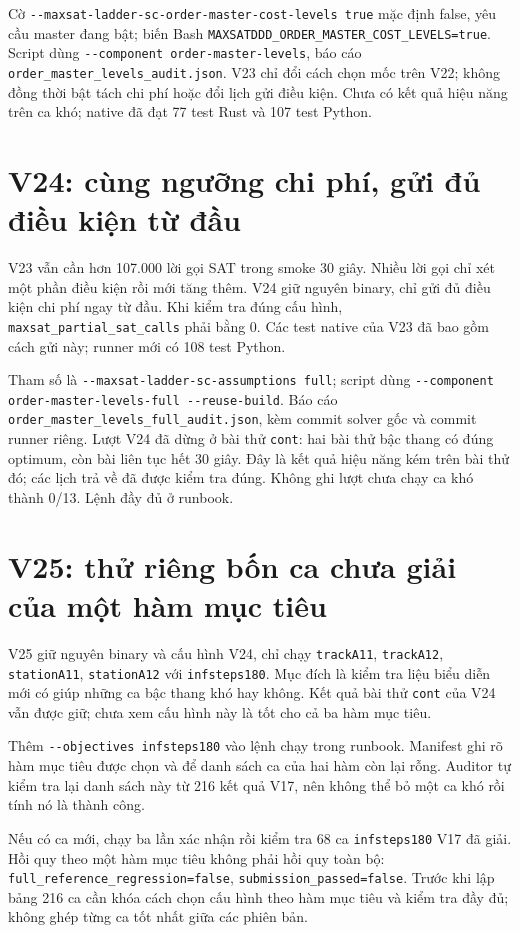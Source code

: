 \documentclass[11pt,a4paper]{article}
\newcommand{\code}[1]{\texttt{#1}}
\newcommand{\file}[1]{\nolinkurl{#1}}
\begin{document}
Cờ \file{--maxsat-ladder-sc-order-master-cost-levels true} mặc định false,
yêu cầu master đang bật; biến Bash
\file{MAXSATDDD_ORDER_MASTER_COST_LEVELS=true}. Script dùng
\file{--component order-master-levels}, báo cáo
\file{order_master_levels_audit.json}. V23 chỉ đổi cách chọn mốc trên V22;
không đồng thời bật tách chi phí hoặc đổi lịch gửi điều kiện. Chưa có
kết quả hiệu năng trên ca khó; native đã đạt 77 test Rust và 107 test
Python.

\section{V24: cùng ngưỡng chi phí, gửi đủ điều kiện từ đầu}

V23 vẫn cần hơn 107.000 lời gọi SAT trong smoke 30 giây. Nhiều lời gọi
chỉ xét một phần điều kiện rồi mới tăng thêm. V24 giữ nguyên binary,
chỉ gửi đủ điều kiện chi phí ngay từ đầu. Khi kiểm tra đúng cấu hình,
\file{maxsat_partial_sat_calls} phải bằng 0. Các test native của V23
đã bao gồm cách gửi này; runner mới có 108 test Python.

Tham số là \file{--maxsat-ladder-sc-assumptions full}; script dùng
\file{--component order-master-levels-full --reuse-build}. Báo cáo
\file{order_master_levels_full_audit.json}, kèm commit solver gốc và
commit runner riêng. Lượt V24 đã dừng ở bài thử \code{cont}: hai bài
thử bậc thang có đúng optimum, còn bài liên tục hết 30 giây. Đây là kết
quả hiệu năng kém trên bài thử đó; các lịch trả về đã được kiểm tra đúng.
Không ghi lượt chưa chạy ca khó thành 0/13. Lệnh đầy đủ ở runbook.

\section{V25: thử riêng bốn ca chưa giải của một hàm mục tiêu}

V25 giữ nguyên binary và cấu hình V24, chỉ chạy
\code{trackA11}, \code{trackA12}, \code{stationA11}, \code{stationA12}
với \code{infsteps180}. Mục đích là kiểm tra liệu biểu diễn mới có giúp
những ca bậc thang khó hay không. Kết quả bài thử \code{cont} của V24
vẫn được giữ; chưa xem cấu hình này là tốt cho cả ba hàm mục tiêu.

Thêm \file{--objectives infsteps180} vào lệnh chạy trong runbook. Manifest
ghi rõ hàm mục tiêu được chọn và để danh sách ca của hai hàm còn lại rỗng.
Auditor tự kiểm tra lại danh sách này từ 216 kết quả V17, nên không thể
bỏ một ca khó rồi tính nó là thành công.

Nếu có ca mới, chạy ba lần xác nhận rồi kiểm tra 68 ca \code{infsteps180}
V17 đã giải. Hồi quy theo một hàm mục tiêu không phải hồi quy toàn bộ:
\file{full_reference_regression=false}, \file{submission_passed=false}.
Trước khi lập bảng 216 ca cần khóa cách chọn cấu hình theo hàm mục tiêu
và kiểm tra đầy đủ; không ghép từng ca tốt nhất giữa các phiên bản.
\end{document}
